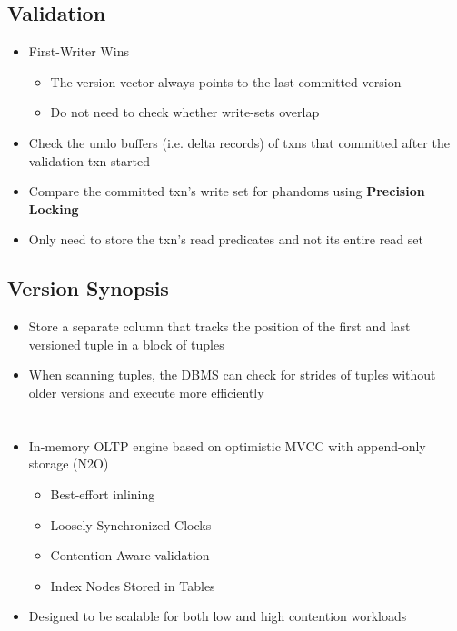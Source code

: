 \documentclass[11pt]{article}
\begin{document}
    \subsection*{Validation}
    \begin{itemize}
        \item First-Writer Wins
        \begin{itemize}
            \item The version vector always points to the last committed version
            \item Do not need to check whether write-sets overlap
        \end{itemize}
        \item Check the undo buffers (i.e. delta records) of txns that committed after the validation txn started
        \item Compare the committed txn's write set for phandoms using \textbf{Precision Locking}
        \item Only need to store the txn's read predicates and not its entire read set
    \end{itemize}
    \subsection*{Version Synopsis}
    \begin{itemize}
        \item Store a separate column that tracks the position of the first and last versioned tuple in a block of tuples
        \item When scanning tuples, the DBMS can check for strides of tuples without older versions and execute more efficiently
    \end{itemize}


\section{}
\begin{itemize}
    \item In-memory OLTP engine based on optimistic MVCC with append-only storage (N2O) ~\cite{p21-lim}
    \begin{itemize}
        \item Best-effort inlining
        \item Loosely Synchronized Clocks
        \item Contention Aware validation
        \item Index Nodes Stored in Tables
    \end{itemize}
    \item Designed to be scalable for both low and high contention workloads
\end{itemize}
\end{document}
